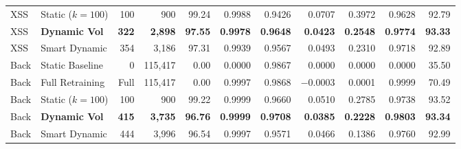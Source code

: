 \begin{table}[htbp]
\begin{tabular}{|l|l|r|r|r|r|r|r|r|r|r|}
XSS  & Static ($k=100$)     & 100  & 900       & 99.24 & 0.9988 & 0.9426 & 0.0707  & 0.3972 & 0.9628 & 92.79 \\
XSS  & \textbf{Dynamic Vol} & \textbf{322} & \textbf{2{,}898} & \textbf{97.55} & \textbf{0.9978} & \textbf{0.9648} & \textbf{0.0423} & \textbf{0.2548} & \textbf{0.9774} & \textbf{93.33} \\
XSS  & Smart Dynamic        & 354  & 3{,}186   & 97.31 & 0.9939 & 0.9567 & 0.0493  & 0.2310 & 0.9718 & 92.89 \\ \hline
Back & Static Baseline      & 0    & 115{,}417 & 0.00  & 0.0000 & 0.9867 & 0.0000  & 0.0000 & 0.0000 & 35.50 \\
Back & Full Retraining      & Full & 115{,}417 & 0.00  & 0.9997 & 0.9868 & $-0.0003$ & 0.0001 & 0.9999 & 70.49 \\
Back & Static ($k=100$)     & 100  & 900       & 99.22 & 0.9999 & 0.9660 & 0.0510  & 0.2785 & 0.9738 & 93.52 \\
Back & \textbf{Dynamic Vol} & \textbf{415} & \textbf{3{,}735} & \textbf{96.76} & \textbf{0.9999} & \textbf{0.9708} & \textbf{0.0385} & \textbf{0.2228} & \textbf{0.9803} & \textbf{93.34} \\
Back & Smart Dynamic        & 444  & 3{,}996   & 96.54 & 0.9997 & 0.9571 & 0.0466  & 0.1386 & 0.9760 & 92.99 \\ \hline
\end{tabular}
\end{table}

